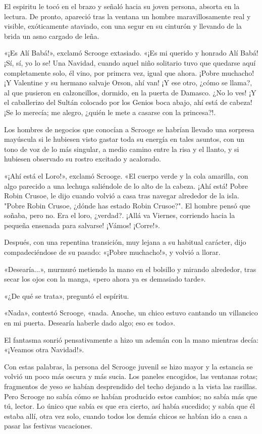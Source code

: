 \documentclass{novela}
\begin{document}
 El espiritu le tocó en el brazo y señaló hacia su joven persona, absorta en la lectura. De pronto, apareció tras la ventana un hombre maravillosamente real y visible, exóticamente ataviado, con una segur en su cinturón y llevando de la brida un asno cargado de leña.

 «¡Es Alí Babá!», exclamó Scrooge extasiado. «¡Es mi querido y honrado Alí Babá! ¡Sí, sí, yo lo se! Una Navidad, cuando aquel niño solitario tuvo que quedarse aquí completamente solo, él vino, por primcra vez, igual que ahora. ¡Pobre muchacho! ¡Y Valentine y su hermano salvaje Orson, ahí van! ¡Y ese otro, ¿cómo se llama?, al que pusieron en calzoncillos, dormido, en la puerta de Damasco. ¿No lo ves! ¡Y el caballerizo del Sultán colocado por los Genios boca abajo, ahí está de cabeza! ¡Se lo merecía; me alegro, ¿quién le mete a casarse con la princesa?!.

 Los hombres de negocios que conocían a Scrooge se habrían llevado una sorpresa mayúscula si le hubiesen visto gastar toda su energía en tales asuntos, con un tono de voz de lo más singular, a medio camino entre la risa y el llanto, y si hubiesen observado su rostro excitado y acalorado.

 «¡Ahí está el Loro!», exclamó Scrooge. «El cuerpo verde y la cola amarilla, con algo parecido a una lechuga saliéndole de lo alto de la cabeza. ¡Ahí está! Pobre Robin Crusoe, le dijo cuando volvió a casa tras navegar alrededor de la isla. "Pobre Robin Crusoe, ¿dónde has estado Robin Crusoe?". El hombre pensó que soñaba, pero no. Era el loro, ¿verdad?. ¡Allá va Viernes, corriendo hacia la pequeña ensenada para salvarse! ¡Vámos! ¡Corre!».

 Después, con una repentina transición, muy lejana a su habitual carácter, dijo compadeciéndose de su pasado: «¡Pobre muchacho!», y volvió a llorar.

 «Desearía...», murmuró metiendo la mano en el bolsillo y mirando alrededor, tras secar los ojos con la manga, «pero ahora ya es demasiado tarde».

 «¿De qué se trata», preguntó el espíritu.

 «Nada», contestó Scrooge, «nada. Anoche, un chico estuvo cantando un villancico en mi puerta. Desearía haberle dado algo; eso es todo».

 El fantasma sonrió pensativamente a hizo un ademán con la mano mientras decía: «¡Veamos otra Navidad!».

 Con estas palabras, la persona del Scrooge juvenil se hizo mayor y la estancia se volvió un poco más oscura y más sucia. Los paneles encogidos, las ventanas rotas; fragmentos de yeso se habían desprendido del techo dejando a la vista las rasillas. Pero Scrooge no sabía cómo se habían producido estos cambios; no sabía más que tú, lector. Lo único que sabía es que era cierto, así había sucedido; y sabía que él estaba allí, otra vez solo, cuando todos los demás chicos se habían ido a casa a pasar las festivas vacaciones.
\end{document}
